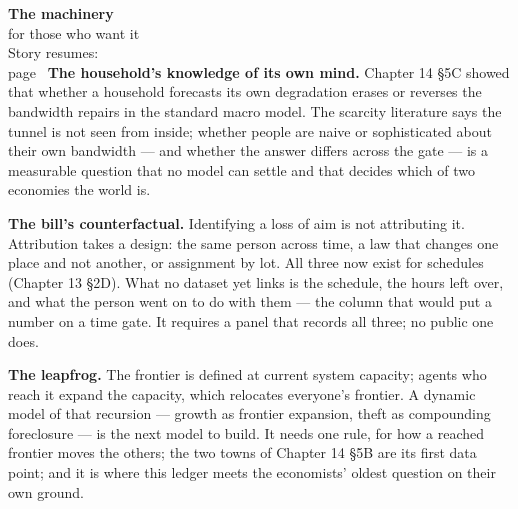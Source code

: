 \begin{machinery}{\textbf{The machinery}\\for those who want it\\[3pt]{\color{muted}Story resumes:\\page~\pageref{ch15-s5}}}
\textbf{The household's knowledge of its own mind.} Chapter 14 §5C showed
that whether a household forecasts its own degradation erases or
reverses the bandwidth repairs in the standard macro model. The
scarcity literature says the tunnel is not seen from inside; whether
people are naive or sophisticated about their own bandwidth --- and
whether the answer differs across the gate --- is a measurable question
that no model can settle and that decides which of two economies the
world is.

\textbf{The bill's counterfactual.} Identifying a loss of aim is not
attributing it. Attribution takes a design: the same person across
time, a law that changes one place and not another, or assignment by
lot. All three now exist for schedules (Chapter 13 §2D). What no
dataset yet links is the schedule, the hours left over, and what the
person went on to do with them --- the column that would put a number
on a time gate. It requires a panel that records all three; no public
one does.

\textbf{The leapfrog.} The frontier is defined at current system capacity;
agents who reach it expand the capacity, which relocates everyone's
frontier. A dynamic model of that recursion --- growth as frontier
expansion, theft as compounding foreclosure --- is the next model to
build. It needs one rule, for how a reached frontier moves the others;
the two towns of Chapter 14 §5B are its first data point; and it is
where this ledger meets the economists' oldest question on their own
ground.


\end{machinery}
